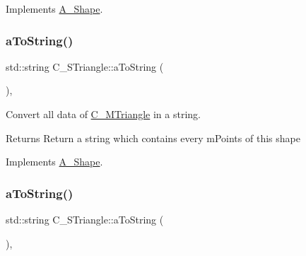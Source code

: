 Implements \hyperlink{classA__Shape_a6996f454b337f8425ad13cba3f7a7c35}{A\+\_\+\+Shape}.

\mbox{\label{classC__STriangle_a1ea089f6a82c2770e0529c4a9fc07d90}} 
\subsubsection{\texorpdfstring{a\+To\+String()}{aToString()}\hspace{0.1cm}{\footnotesize\ttfamily [1/2]}}
{\footnotesize\ttfamily std\+::string C\+\_\+\+S\+Triangle\+::a\+To\+String (\begin{DoxyParamCaption}{ }\end{DoxyParamCaption})\hspace{0.3cm}{\ttfamily [override]}, {\ttfamily [virtual]}}



Convert all data of \hyperlink{classC__MTriangle}{C\+\_\+\+M\+Triangle} in a string. 

\begin{DoxyReturn}{Returns}
Return a string which contains every m\+Points of this shape 
\end{DoxyReturn}


Implements \hyperlink{classA__Shape_ad8804b4e74543db374af6892367b7c2e}{A\+\_\+\+Shape}.

\mbox{\label{classC__STriangle_a1ea089f6a82c2770e0529c4a9fc07d90}} 
\subsubsection{\texorpdfstring{a\+To\+String()}{aToString()}\hspace{0.1cm}{\footnotesize\ttfamily [2/2]}}
{\footnotesize\ttfamily std\+::string C\+\_\+\+S\+Triangle\+::a\+To\+String (\begin{DoxyParamCaption}{ }\end{DoxyParamCaption})\hspace{0.3cm}{\ttfamily [override]}, {\ttfamily [virtual]}}



